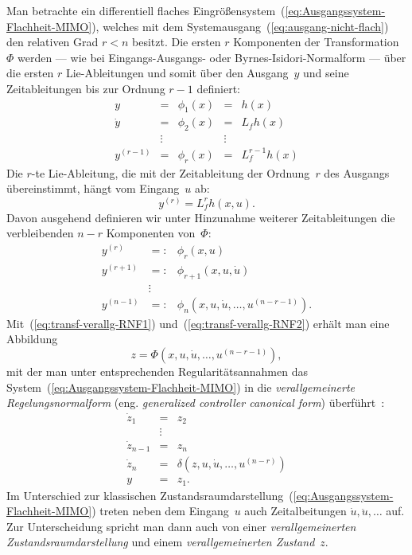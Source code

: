 Man betrachte ein differentiell flaches Eingrößensystem~(\ref{eq:Ausgangssystem-Flachheit-MIMO}),
welches mit dem Systemausgang~(\ref{eq:ausgang-nicht-flach}) den
relativen Grad $r<n$ besitzt. Die ersten $r$ Komponenten der Transformation~$\Phi$
werden --- wie bei Eingangs-Ausgangs- oder Byrnes-Isidori-Normalform
--- über die ersten $r$ Lie-Ableitungen und somit über den Ausgang~$y$
und seine Zeitableitungen bis zur Ordnung $r-1$ definiert:
\begin{equation}
\begin{array}{lclcl}
y & = & \phi_{1}(x) & = & h(x)\\
\dot{y} & = & \phi_{2}(x) & = & L_{f}h(x)\\
 & \vdots &  & \vdots\\
y^{(r-1)} & = & \phi_{r}(x) & = & L_{f}^{r-1}h(x)
\end{array}\label{eq:transf-verallg-RNF1}
\end{equation}
Die $r$-te Lie-Ableitung, die mit der Zeitableitung der Ordnung~$r$
des Ausgangs übereinstimmt, hängt vom Eingang~$u$ ab:
\begin{equation}
y^{(r)}=L_{f}^{r}h(x,u).\label{eq:yr-verallg-RNF}
\end{equation}
Davon ausgehend definieren wir unter Hinzunahme weiterer Zeitableitungen
die verbleibenden $n-r$ Komponenten von~$\Phi$:
\begin{equation}
\begin{array}{lcl}
y^{(r)} & =: & \phi_{r}(x,u)\\
y^{(r+1)} & =: & \phi_{r+1}(x,u,\dot{u})\\
 & \vdots\\
y^{(n-1)} & =: & \phi_{n}(x,u,\dot{u},\ldots,u^{(n-r-1)}).
\end{array}\label{eq:transf-verallg-RNF2}
\end{equation}
Mit~(\ref{eq:transf-verallg-RNF1}) und~(\ref{eq:transf-verallg-RNF2})
erhält man eine Abbildung 
\[
z=\Phi(x,u,\dot{u},\ldots,u^{(n-r-1)}),
\]
mit der man unter entsprechenden Regularitätsannahmen das System~(\ref{eq:Ausgangssystem-Flachheit-MIMO})
in die \emph{verallgemeinerte Regelungsnormalform}
(eng. \emph{generalized controller canonical form}) überführt~\cite{fliess1990}:
\begin{equation}
\begin{array}{lcl}
\dot{z}_{1} & = & z_{2}\\
 & \vdots\\
\dot{z}_{n-1} & = & z_{n}\\
\dot{z}_{n} & = & \delta(z,u,\dot{u},\ldots,u^{(n-r)})\\
y & = & z_{1}.
\end{array}\label{eq:verallgemeinerte-Regelungsnormalform}
\end{equation}
Im Unterschied zur klassischen Zustandsraumdarstellung~(\ref{eq:Ausgangssystem-Flachheit-MIMO})
treten neben dem Eingang~$u$ auch Zeitalbeitungen $\dot{u},\ddot{u},\ldots$
auf. Zur Unterscheidung spricht man dann auch von einer \emph{verallgemeinerten
Zustandsraumdarstellung} und einem \emph{verallgemeinerten Zustand}~$z$.

